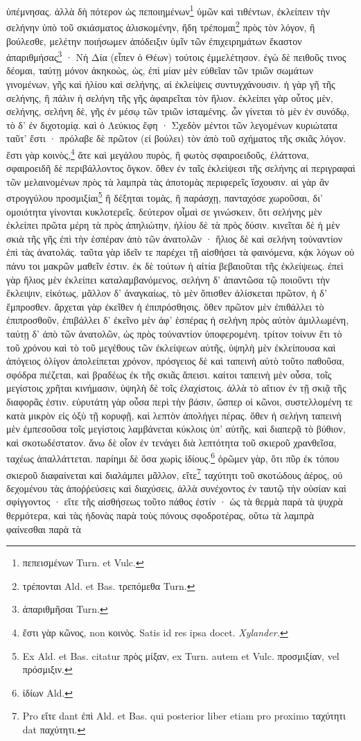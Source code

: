 \documentclass[a4paper, 11pt, oneside, polutonikogreek, german]{article}
\begin{document}
ὑπέμνησας. ἀλλὰ δὴ πότερον ὡς πεποιημένων\footnote{πεπεισμένων Turn. et Vulc.} ὑμῶν καὶ τιθέντων, ἐκλείπειν τὴν σελήνην ὑπὸ τοῦ σκιάσματος ἁλισκομένην, ἤδη τρέπομαι\footnote{τρέπονται Ald. et Bas. τρεπόμεθα Turn.} πρὸς τὸν λόγον, ἢ βούλεσθε, μελέτην ποιήσωμεν ἀπόδειξιν ὑμῖν τῶν ἐπιχειρημάτων ἕκαστον ἀπαριθμήσας\footnote{ἀπαριθμῆσαι Turn.} · Νὴ Δία (εἶπεν ὁ Θέων) τούτοις ἐμμελέτησον. ἐγὼ δὲ πειθοῦς τινος δέομαι, ταύτῃ μόνον ἀκηκοὼς, ὡς, ἐπὶ μίαν μὲν εὐθεῖαν τῶν τριῶν σωμάτων γινομένων, γῆς καὶ ἡλίου καὶ σελήνης, αἱ ἐκλείψεις συντυγχάνουσιν. ἡ γὰρ γῆ τῆς σελήνης, ἢ πάλιν ἡ σελήνη τῆς γῆς ἀφαιρεῖται τὸν ἥλιον. ἐκλείπει γὰρ οὗτος μὲν, σελήνης, σελήνη δὲ, γῆς ἐν μέσῳ τῶν τριῶν ἱσταμένης. ὧν γίνεται τὸ μὲν ἐν συνόδῳ, τὸ δ' ἐν διχοτομίᾳ. καὶ ὁ Λεύκιος ἔφη · Σχεδὸν μέντοι τῶν λεγομένων κυριώτατα ταῦτ' ἔστι · πρόλαβε δὲ πρῶτον (εἰ βούλει) τὸν ἀπὸ τοῦ σχήματος τῆς σκιᾶς λόγον. ἔστι γὰρ κοινὸς,\footnote{ἔστι γὰρ κῶνος, non κοινὸς. Satis id res ipsa docet. \emph{Xylander.}} ἅτε καὶ μεγάλου πυρὸς, ἢ φωτὸς σφαιροειδοῦς, ἐλάττονα, σφαιροειδῆ δὲ περιβάλλοντος ὄγκον. ὅθεν ἐν ταῖς ἐκλείψεσι τῆς σελήνης αἱ περιγραφαὶ τῶν μελαινομένων πρὸς τὰ λαμπρὰ τὰς ἀποτομὰς περιφερεῖς ἴσχουσιν. αἱ γὰρ ἂν στρογγύλου προσμιξίαι\footnote{Ex Ald. et Bas. citatur πρὸς μίξαν, ex Turn. autem et Vulc. προσμιξίαν, vel πρόσμιξιν.} ἢ δέξηται τομὰς, ἢ παράσχῃ, πανταχόσε χωροῦσαι, δι' ομοιότητα γίνονται κυκλοτερεῖς. δεύτερον οἶμαὶ σε γινώσκειν, ὅτι σελήνης μὲν ἐκλείπει πρῶτα μέρη τὰ πρὸς ἀπηλιώτην, ἡλίου δὲ τὰ πρὸς δύσιν. κινεῖται δὲ ἡ μὲν σκιὰ τῆς γῆς ἐπὶ τὴν ἑσπέραν ἀπὸ τῶν ἀνατολῶν · ἥλιος δὲ καὶ σελήνη τοὐναντίον ἐπὶ τὰς ἀνατολάς. ταῦτα γὰρ ἰδεῖν τε παρέχει τῇ αἰσθήσει τὰ φαινόμενα, κᾀκ λόγων οὐ πάνυ τοι μακρῶν μαθεῖν ἐστιν. ἐκ δὲ τούτων ἡ αἰτία βεβαιοῦται τῆς ἐκλείψεως. ἐπεὶ γὰρ ἥλιος μὲν ἐκλείπει καταλαμβανόμενος, σελήνη δ' ἀπαντῶσα τῷ ποιοῦντι τὴν ἔκλειψιν, εἰκότως, μᾶλλον δ' ἀναγκαίως, τὸ μὲν ὄπισθεν ἁλίσκεται πρῶτον, ἡ δ' ἔμπροσθεν. ἄρχεται γὰρ ἐκεῖθεν ἡ ἐπιπρόσθησις. ὅθεν πρῶτον μὲν ἐπιθάλλει τὸ ἐπιπροσθοῦν, ἐπιβάλλει δ' ἐκεῖνο μὲν ἀφ' ἑσπέρας ἡ σελήνη πρὸς αὐτὸν ἁμιλλωμένη, ταύτῃ δ' ἀπὸ τῶν ἀνατολῶν, ὡς πρὸς τοὐναντίον ὑποφερομένη. τρίτον τοίνυν ἔτι τὸ τοῦ χρόνου καὶ τὸ τοῦ μεγέθους τῶν ἐκλείψεων αὐτῆς, ὑψηλὴ μὲν ἐκλείπουσα καὶ ἀπόγειος ὀλίγον ἀπολείπεται χρόνον, πρόσγειος δὲ καὶ ταπεινὴ αὐτὸ τοῦτο παθοῦσα, σφόδρα πιέζεται, καὶ βραδέως ἐκ τῆς σκιᾶς ἄπεισι. καίτοι ταπεινὴ μὲν οὖσα, τοῖς μεγίστοις χρῆται κινήμασιν, ὑψηλὴ δὲ τοῖς ἐλαχίστοις. ἀλλὰ τὸ αἴτιον ἐν τῇ σκιᾷ τῆς διαφορᾶς ἐστιν. εὐρυτάτη γὰρ οὖσα περὶ τὴν βάσιν, ὥσπερ οἱ κῶνοι, συστελλομένη τε κατὰ μικρὸν εἰς ὀξὺ τῇ κορυφῇ, καὶ λεπτὸν ἀπολήγει πέρας. ὅθεν ἡ σελήνη ταπεινὴ μὲν ἐμπεσοῦσα τοῖς μεγίστοις λαμβάνεται κύκλοις ὑπ' αὐτῆς, καὶ διαπερᾷ τὸ βύθιον, καὶ σκοτωδέστατον. ἄνω δὲ οἷον ἐν τενάγει διὰ λεπτότητα τοῦ σκιεροῦ χρανθεῖσα, ταχέως ἀπαλλάττεται. παρίημι δὲ ὅσα χωρὶς ἰδίους.\footnote{ἰδίων Ald.} ὁρῶμεν γὰρ, ὅτι πῦρ ἐκ τόπου σκιεροῦ διαφαίνεται καὶ διαλάμπει μᾶλλον, εἴτε\footnote{Pro εἴτε dant ἐπὶ Ald. et Bas. qui posterior liber etiam pro proximo ταχύτητι dat παχύτητι.} ταχύτητι τοῦ σκοτώδους ἀέρος, οὐ δεχομένου τὰς ἀποῤῥεύσεις καὶ διαχύσεις, ἀλλὰ συνέχοντος ἐν ταυτῷ τὴν οὐσίαν καὶ σφίγγοντος · εἴτε τῆς αἰσθήσεως τοῦτο πάθος ἐστίν · ὡς τὰ θερμὰ παρὰ τὰ ψυχρὰ θερμότερα, καὶ τὰς ἡδονὰς παρὰ τοὺς πόνους σφοδροτέρας, οὕτω τὰ λαμπρὰ φαίνεσθαι παρὰ τὰ 
\end{document}

